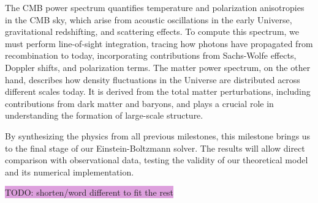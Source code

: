 \documentclass{aa}
\numberwithin{equation}{section}
\numberwithin{table}{section}
\numberwithin{figure}{section}
\begin{document}
The CMB power spectrum quantifies temperature and polarization anisotropies in the CMB sky, which arise from acoustic oscillations in the early Universe, gravitational redshifting, and scattering effects. To compute this spectrum, we must perform line-of-sight integration, tracing how photons have propagated from recombination to today, incorporating contributions from Sachs-Wolfe effects, Doppler shifts, and polarization terms. The matter power spectrum, on the other hand, describes how density fluctuations in the Universe are distributed across different scales today. It is derived from the total matter perturbations, including contributions from dark matter and baryons, and plays a crucial role in understanding the formation of large-scale structure.  

By synthesizing the physics from all previous milestones, this milestone brings us to the final stage of our Einstein-Boltzmann solver. The results will allow direct comparison with observational data, testing the validity of our theoretical model and its numerical implementation.

\colorbox{Plum}{TODO: shorten/word different to fit the rest}
\end{document}
